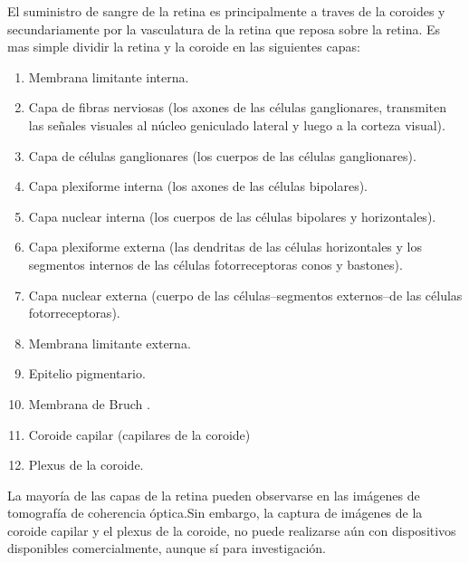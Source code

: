 El suministro de sangre de la retina es principalmente a traves de la coroides y secundariamente por la vasculatura de la retina que reposa sobre la retina. Es mas simple dividir la retina y la coroide en las siguientes capas:
\begin{enumerate}[1.]
    \item Membrana limitante interna.
    \item Capa de fibras nerviosas (los axones de las células ganglionares, transmiten las señales visuales al núcleo geniculado lateral y luego a la corteza visual).
    \item Capa de células ganglionares (los cuerpos de las células ganglionares).
    \item	Capa plexiforme interna (los axones de las células bipolares).
	\item Capa nuclear interna (los cuerpos de las células bipolares y horizontales).
	\item Capa plexiforme externa (las dendritas de las células horizontales y los segmentos internos de las células fotorreceptoras conos y bastones).
	\item Capa nuclear externa (cuerpo de las células--segmentos externos--de las células fotorreceptoras).
	\item Membrana limitante externa.
	\item Epitelio pigmentario.
	\item Membrana de Bruch .
	\item Coroide capilar (capilares de la coroide)
	\item Plexus de la coroide.
 
\end{enumerate}



La mayoría de las capas de la retina pueden observarse en las imágenes de tomografía de coherencia óptica.Sin embargo, la captura de imágenes de la coroide capilar y el plexus de la coroide, no puede realizarse aún con dispositivos disponibles comercialmente, aunque sí para investigación.\cite{abramoff2010retinal}



